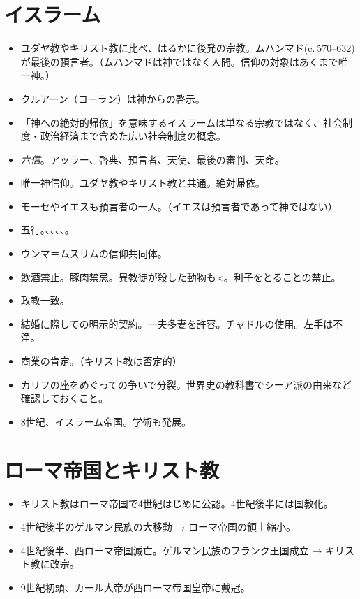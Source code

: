\documentclass[uplatex,dvipdfmx]{jsarticle} \usepackage{mystyle}%
\begin{document}
\section{イスラーム}


\begin{itemize}

\item ユダヤ教やキリスト教に比べ、はるかに後発の宗教。ムハンマド(c. 570–632)が最後の預言者。（ムハンマドは神ではなく人間。信仰の対象はあくまで唯一神。）
\item クルアーン（コーラン）は神からの啓示。
\item 「神への絶対的帰依」を意味するイスラームは単なる宗教ではなく、社会制度・政治経済まで含めた広い社会制度の概念。
\item \emph{六信}。アッラー、啓典、預言者、天使、最後の審判、天命。

\item 唯一神信仰。ユダヤ教やキリスト教と共通。絶対帰依。
\item モーセやイエスも預言者の一人。（イエスは預言者であって神ではない）
\item 五行。、、、、。
\item ウンマ＝ムスリムの信仰共同体。
\item 飲酒禁止。豚肉禁忌。異教徒が殺した動物も×。利子をとることの禁止。
\item 政教一致。
\item 結婚に際しての明示的契約。一夫多妻を許容。チャドルの使用。左手は不浄。
\item 商業の肯定。（キリスト教は否定的）
\item カリフの座をめぐっての争いで分裂。世界史の教科書でシーア派の由来など確認しておくこと。
\item 8世紀、イスラーム帝国。学術も発展。
\end{itemize}








\section{ローマ帝国とキリスト教}

\begin{itemize}
\item キリスト教はローマ帝国で4世紀はじめに公認。4世紀後半には国教化。
\item 4世紀後半のゲルマン民族の大移動 → ローマ帝国の領土縮小。
\item 4世紀後半、西ローマ帝国滅亡。ゲルマン民族のフランク王国成立 → キリスト教に改宗。
\item 9世紀初頭、カール大帝が西ローマ帝国皇帝に戴冠。
\end{itemize}
\end{document}
